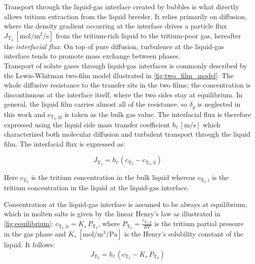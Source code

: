 \documentclass[a4paper,11pt,oneside]{report}
\newcommand{\PT}{\ensuremath{P_\mathrm{T_2}}}
\newcommand{\CT}{\ensuremath{c_\mathrm{T_2}}}
\newcommand{\JT}{\ensuremath{J_\mathrm{T_2}}}
\begin{document}
Transport through the liquid-gas interface created by bubbles is what directly allows tritium extraction from the liquid breeder. 
It relies primarily on diffusion, where the density gradient occurring at the interface drives a particle flux $\JT \:\mathrm{[mol/m^2/s]}$ from the tritium-rich liquid to the tritium-poor gas, hereafter the \textit{interfacial flux}. On top of pure diffusion, turbulence at the liquid-gas interface tends to promote mass exchange between phases. 
\\
Transport of solute gases through liquid-gas interfaces is commonly described by the Lewis-Whitman two-film model\cite{lewis_principles_1924} illustrated in \cref{fig:two_film_model}. The whole diffusive resistance to the transfer sits in the two films; the concentration is discontinuous at the interface itself, where the two sides stay at equilibrium. In general, the liquid film carries almost all of the resistance, so $\delta_g$ is neglected in this work and $c_\mathrm{T_2,gi}$ is taken as the bulk gas value\cite{ricapito_tritium_2011}. The interfacial flux is therefore expressed using the liquid side mass transfer coefficient $h_l \:\mathrm{[m/s]}$ which characterized both molecular diffusion and turbulent transport through the liquid film. The interfacial flux is expressed as:


\begin{equation*}
    \JT = h_l \,(\CT-c_\mathrm{T_2,li})
\end{equation*}

Here $\CT$ is the tritium concentration in the bulk liquid whereas $c_\mathrm{T_2,i}$ is the tritium concentration in the liquid at the liquid-gas interface.
\par
Concentration at the liquid-gas interface is assumed to be always at equilibrium\cite{ricapito_tritium_2011}, which in molten salts is given by the linear Henry's law as illustrated in \cref{fig:equilibrium}: $c_\mathrm{T_2,li}=K_s \,\PT$, where $\PT=\frac{c_\mathrm{T_2,g}}{RT}$ is the tritium partial pressure in the gas phase and $K_s \: \mathrm{[mol/m^3/Pa]}$ is the Henry's solubility constant of the liquid. It follows:
\begin{equation}
    \label{eq:JT2}
    \JT = h_l \, (\CT-K_s\,\PT)
\end{equation}
\end{document}
